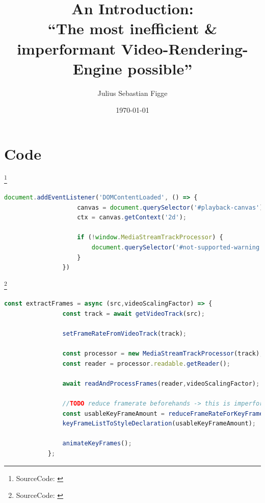 \documentclass[xcolor=dvipsnames,10pt]{beamer}
\author{Julius Sebastian Figge}
\title[inefficient+imperformant video rendering]{
	An Introduction:\\\enquote{The most inefficient \& imperformant Video-Rendering-Engine possible}}
\date{\today}
\begin{document}
\begin{frame}
\titlepage
{}
\end{frame}

\begin{frame}
	\tableofcontents
\end{frame}

\section{Code}
\begin{frame}[fragile]{\secname\footnote{SourceCode: \cite{videoToCss}}}
	\begin{center}
		\begin{minipage}{1\textwidth}
			\begin{lstlisting}[language=JavaScript, caption=on document load]
				document.addEventListener('DOMContentLoaded', () => {
					canvas = document.querySelector('#playback-canvas');
					ctx = canvas.getContext('2d');

					if (!window.MediaStreamTrackProcessor) {
						document.querySelector('#not-supported-warning').style.display = 'unset';
					}
				})
			\end{lstlisting}
		\end{minipage}
	\end{center}
\end{frame}
\begin{frame}[fragile]{\secname\footnote{SourceCode: \cite{videoToCss}}}
	\begin{center}
		\begin{minipage}{1\textwidth}
			\begin{lstlisting}[language=JavaScript, caption=extractFrames()]
			const extractFrames = async (src,videoScalingFactor) => {
				const track = await getVideoTrack(src);

				setFrameRateFromVideoTrack(track);

				const processor = new MediaStreamTrackProcessor(track);
				const reader = processor.readable.getReader();

				await readAndProcessFrames(reader,videoScalingFactor);

				//TODO reduce framerate beforehands -> this is imperformant as hell
				const usableKeyFrameAmount = reduceFrameRateForKeyFrames();
				keyFrameListToStyleDeclaration(usableKeyFrameAmount);

				animateKeyFrames();
			};
			\end{lstlisting}
		\end{minipage}
	\end{center}
\end{frame}
\end{document}

